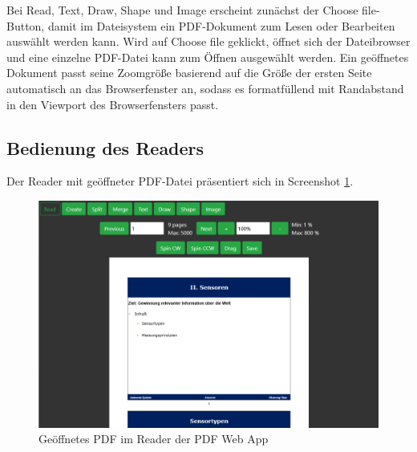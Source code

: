 Bei Read, Text, Draw, Shape und Image erscheint zunächst der Choose file-Button, damit im Dateisystem ein PDF-Dokument zum Lesen oder Bearbeiten auswählt werden kann. Wird auf Choose file geklickt, öffnet sich der Dateibrowser und eine einzelne PDF-Datei kann zum Öffnen ausgewählt werden. Ein geöffnetes Dokument passt seine Zoomgröße basierend auf die Größe der ersten Seite automatisch an das Browserfenster an, sodass es formatfüllend mit Randabstand in den Viewport des Browserfensters passt. 

\subsection{Bedienung des Readers}
Der Reader mit geöffneter PDF-Datei präsentiert sich in Screenshot \ref{fig:reader}.

\begin{figure}[!htbp]
	\centering
	\includegraphics[width=1\textwidth]{"images/reader.png"}
	\caption{Geöffnetes PDF im Reader der PDF Web App}
	\label{fig:reader}
\end{figure}

